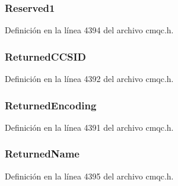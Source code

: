 \subsubsection[{Reserved1}]{ Reserved1}\label{structtag_m_q_i_m_p_o_a4559672a5bdaff57eb82aa03d163ed47}


Definición en la línea 4394 del archivo cmqc.\+h.

\hypertarget{structtag_m_q_i_m_p_o_a1b119a33db820271cc96e8c9bb903878}{}
\subsubsection[{Returned\+C\+C\+S\+I\+D}]{ Returned\+C\+C\+S\+I\+D}\label{structtag_m_q_i_m_p_o_a1b119a33db820271cc96e8c9bb903878}


Definición en la línea 4392 del archivo cmqc.\+h.

\hypertarget{structtag_m_q_i_m_p_o_a6d25b830b8da987b7036e612b63cc493}{}
\subsubsection[{Returned\+Encoding}]{ Returned\+Encoding}\label{structtag_m_q_i_m_p_o_a6d25b830b8da987b7036e612b63cc493}


Definición en la línea 4391 del archivo cmqc.\+h.

\hypertarget{structtag_m_q_i_m_p_o_ac8906d395aadf10bc120ea24a3dab637}{}
\subsubsection[{Returned\+Name}]{ Returned\+Name}\label{structtag_m_q_i_m_p_o_ac8906d395aadf10bc120ea24a3dab637}


Definición en la línea 4395 del archivo cmqc.\+h.


